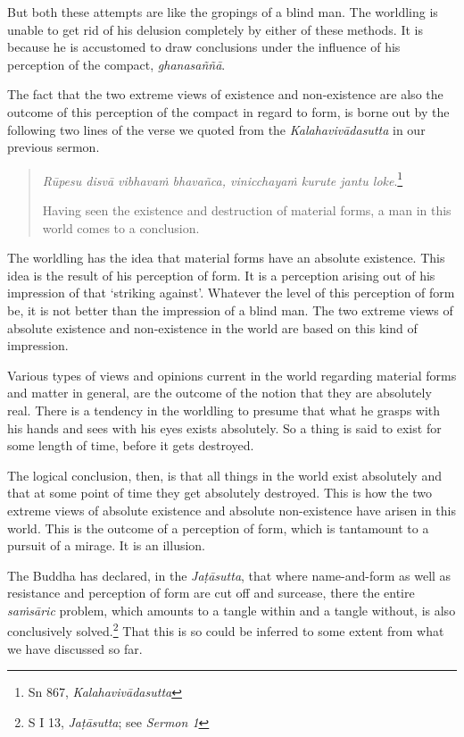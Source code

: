 But both these attempts are like the gropings of a blind man. The worldling is unable to get rid of his delusion completely by either of these methods. It is because he is accustomed to draw conclusions under the influence of his perception of the compact, \emph{ghanasaññā}.

The fact that the two extreme views of existence and non-existence are also the outcome of this perception of the compact in regard to form, is borne out by the following two lines of the verse we quoted from the \emph{Kalahavivādasutta} in our previous sermon.

\begin{quote}
\emph{Rūpesu disvā vibhavaṁ bhavañca, vinicchayaṁ kurute jantu loke}.\footnote{Sn 867, \emph{Kalahavivādasutta}}

Having seen the existence and destruction of material forms, a man in this world comes to a conclusion.
\end{quote}

The worldling has the idea that material forms have an absolute existence. This idea is the result of his perception of form. It is a perception arising out of his impression of that `striking against'. Whatever the level of this perception of form be, it is not better than the impression of a blind man. The two extreme views of absolute existence and non-existence in the world are based on this kind of impression.

Various types of views and opinions current in the world regarding material forms and matter in general, are the outcome of the notion that they are absolutely real. There is a tendency in the worldling to presume that what he grasps with his hands and sees with his eyes exists absolutely. So a thing is said to exist for some length of time, before it gets destroyed.

The logical conclusion, then, is that all things in the world exist absolutely and that at some point of time they get absolutely destroyed. This is how the two extreme views of absolute existence and absolute non-existence have arisen in this world. This is the outcome of a perception of form, which is tantamount to a pursuit of a mirage. It is an illusion.

The Buddha has declared, in the \emph{Jaṭāsutta}, that where name-and-form as well as resistance and perception of form are cut off and surcease, there the entire \emph{saṁsāric} problem, which amounts to a tangle within and a tangle without, is also conclusively solved.\footnote{S I 13, \emph{Jaṭāsutta}; see \emph{Sermon 1}} That this is so could be inferred to some extent from what we have discussed so far.

